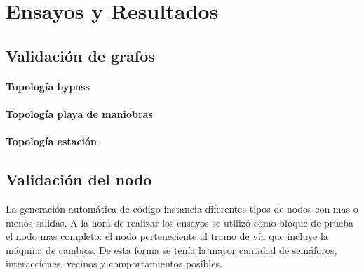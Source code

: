 
\chapter{Ensayos y Resultados} %

\label{Chapter4} %




\section{Validación de grafos}
	
	\subsubsection{Topología bypass}
	\subsubsection{Topología playa de maniobras}
	\subsubsection{Topología estación}
			
\section{Validación del nodo}

	La generación automática de código instancia diferentes tipos de nodos con mas o menos salidas. A la hora de realizar los ensayos se utilizó como bloque de prueba el nodo mas completo: el nodo perteneciente al tramo de vía que incluye la máquina de cambios. De esta forma se tenía la mayor cantidad de semáforos, interacciones, vecinos y comportamientos posibles.
	
